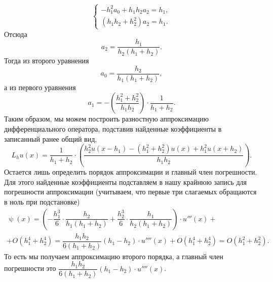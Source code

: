 \documentclass[a4paper, 12pt]{article}
\renewcommand{\psi}{\uppsi}
\begin{document}
\begin{enumerate}
$$\begin{cases}
		-h_1^2 a_{0}+ h_1h_2 a_2= h_1,\\
		(h_1h_2 + h_2^2)a_2 = h_1.
	\end{cases}$$
	Отсюда $$a_2 = \dfrac{h_1}{h_2 (h_1+h_2)}.$$
	Тогда из второго уравнения $$a_{0} = \dfrac{h_2}{h_1 (h_1+h_2)},$$ а из первого уравнения $$a_1 = -\left(\dfrac{h_1^2+h_2^2}{h_1h_2}\right)\cdot \dfrac{1}{h_1+h_2}.$$
	Таким образом, мы можем построить разностную аппроксимацию дифференциального оператора, подставив найденные коэффициенты в записанный ранее общий вид,
	$$L_h u(x) = \dfrac{1}{h_1+h_2}\cdot\left(\dfrac{h_2^2 u(x-h_1) -(h_1^2+h_2^2)u(x) + h_1^2u(x+h_2)}{h_1h_2}\right).$$ 
	Остается лишь определить порядок аппроксимации и главный член погрешности. Для этого найденные коэффициенты подставляем в нашу крайнюю запись для погрешности аппроксимации (учитываем, что первые три слагаемых обращаются в ноль при подстановке)
	\begin{multline*}
		\psi(x) = \left(-\dfrac{h_1^3}{6}\cdot \dfrac{h_2}{h_1 (h_1+h_2)} +\dfrac{h_2^3}{6} \cdot \dfrac{h_1}{h_2 (h_1+h_2)}\right)\cdot u'''(x) +\\+O(h_1^4+h_2^4) = \dfrac{h_1h_2}{6(h_1+h_2)}(h_1-h_2)\cdot u''''(x) + O(h_1^4+h_2^4) = O(h_1^2+h_2^2).
	\end{multline*}
	То есть мы получаем аппроксимацию второго порядка, а главный член погрешности это $\dfrac{h_1h_2}{6(h_1+h_2)}(h_1-h_2)\cdot u''''(x)$.
	\end{enumerate}
	
\end{document}
